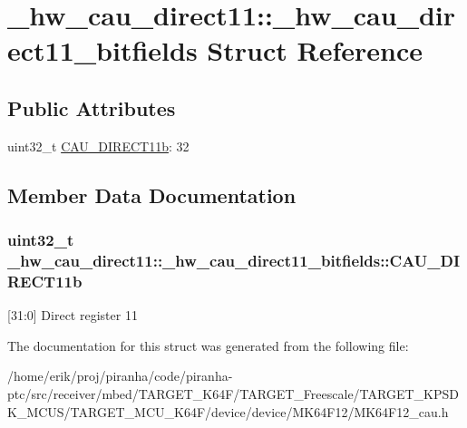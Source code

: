 \hypertarget{struct__hw__cau__direct11_1_1__hw__cau__direct11__bitfields}{}\section{\+\_\+hw\+\_\+cau\+\_\+direct11\+:\+:\+\_\+hw\+\_\+cau\+\_\+direct11\+\_\+bitfields Struct Reference}
\label{struct__hw__cau__direct11_1_1__hw__cau__direct11__bitfields}
\subsection*{Public Attributes}
\begin{DoxyCompactItemize}
\item 
uint32\+\_\+t \hyperlink{struct__hw__cau__direct11_1_1__hw__cau__direct11__bitfields_aff11392c4f468e80217498a1d8dcd7aa}{C\+A\+U\+\_\+\+D\+I\+R\+E\+C\+T11b}\+: 32
\end{DoxyCompactItemize}


\subsection{Member Data Documentation}
\subsubsection[{\texorpdfstring{C\+A\+U\+\_\+\+D\+I\+R\+E\+C\+T11b}{CAU_DIRECT11b}}]{\setlength{\rightskip}{0pt plus 5cm}uint32\+\_\+t \+\_\+hw\+\_\+cau\+\_\+direct11\+::\+\_\+hw\+\_\+cau\+\_\+direct11\+\_\+bitfields\+::\+C\+A\+U\+\_\+\+D\+I\+R\+E\+C\+T11b}\hypertarget{struct__hw__cau__direct11_1_1__hw__cau__direct11__bitfields_aff11392c4f468e80217498a1d8dcd7aa}{}\label{struct__hw__cau__direct11_1_1__hw__cau__direct11__bitfields_aff11392c4f468e80217498a1d8dcd7aa}
\mbox{[}31\+:0\mbox{]} Direct register 11 

The documentation for this struct was generated from the following file\+:\begin{DoxyCompactItemize}
\item 
/home/erik/proj/piranha/code/piranha-\/ptc/src/receiver/mbed/\+T\+A\+R\+G\+E\+T\+\_\+\+K64\+F/\+T\+A\+R\+G\+E\+T\+\_\+\+Freescale/\+T\+A\+R\+G\+E\+T\+\_\+\+K\+P\+S\+D\+K\+\_\+\+M\+C\+U\+S/\+T\+A\+R\+G\+E\+T\+\_\+\+M\+C\+U\+\_\+\+K64\+F/device/device/\+M\+K64\+F12/M\+K64\+F12\+\_\+cau.\+h\end{DoxyCompactItemize}
